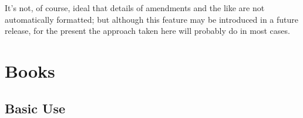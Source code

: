 \documentclass[a5paper,fontsize=9pt,DIV=1]{scrartcl}
\newcommand{\egcite}[1]{\texttt{\textbackslash cite#1}}
\begin{document}
\begin{description}[leftmargin=3.6cm,labelwidth=3.4cm,labelsep=0.2cm]
\item[\egcite{\{echr:treaty\}}] \cite{echr:treaty}
\end{description}

It's not, of course, ideal that details of amendments and the like are
not automatically formatted; but although this feature may be
introduced in a future release, for the present the approach taken
here will probably do in most cases.

\section{Books}

\subsection{Basic Use}
\end{document}
